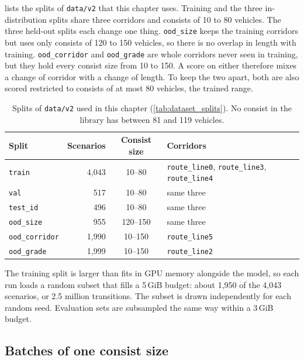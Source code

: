  lists the splits of \texttt{data/v2} that this chapter uses. Training and the three in-distribution splits share three corridors and consists of 10 to 80 vehicles. The three held-out splits each change one thing. \texttt{ood\_size} keeps the training corridors but uses only consists of 120 to 150 vehicles, so there is no overlap in length with training. \texttt{ood\_corridor} and \texttt{ood\_grade} are whole corridors never seen in training, but they hold every consist size from 10 to 150. A score on either therefore mixes a change of corridor with a change of length. To keep the two apart, both are also scored restricted to consists of at most 80 vehicles, the trained range.

\begin{table}[htbp]
    \centering
    \begin{tabular}{lrcl}
        \toprule
        Split & Scenarios & Consist size & Corridors \\
        \midrule
        \texttt{train}        & 4,043 & 10--80  & \texttt{route\_line0}, \texttt{route\_line3}, \texttt{route\_line4} \\
        \texttt{val}          & 517   & 10--80  & same three \\
        \texttt{test\_id}     & 496   & 10--80  & same three \\
        \texttt{ood\_size}    & 955   & 120--150 & same three \\
        \texttt{ood\_corridor} & 1,990 & 10--150 & \texttt{route\_line5} \\
        \texttt{ood\_grade}   & 1,999 & 10--150 & \texttt{route\_line2} \\
        \bottomrule
    \end{tabular}
    \caption{Splits of \texttt{data/v2} used in this chapter (\cref{tab:dataset_splits}). No consist in the library has between 81 and 119 vehicles.}
    \label{tab:train_splits}
\end{table}

The training split is larger than fits in GPU memory alongside the model, so each run loads a random subset that fills a 5\,GiB budget: about 1,950 of the 4,043 scenarios, or 2.5 million transitions. The subset is drawn independently for each random seed. Evaluation sets are subsampled the same way within a 3\,GiB budget.

\subsection{Batches of one consist size}

